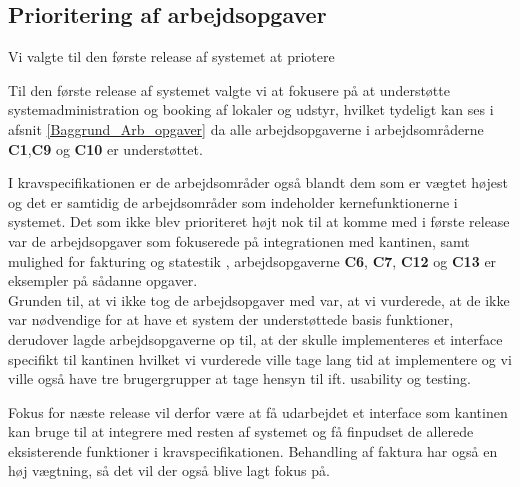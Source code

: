 \subsection{Prioritering af arbejdsopgaver}
\label{Evaluation_workareas_priorities}
Vi valgte til den første release af systemet at priotere

Til den første release af systemet valgte vi at fokusere på at understøtte systemadministration og booking af lokaler og udstyr, hvilket tydeligt kan ses i afsnit \ref{Baggrund_Arb_opgaver} da alle arbejdsopgaverne i arbejdsområderne \textbf{C1},\textbf{C9} og \textbf{C10} er understøttet. 

I kravspecifikationen er de arbejdsområder også blandt dem som er vægtet højest og det er samtidig de arbejdsområder som indeholder kernefunktionerne i systemet. Det som ikke blev prioriteret højt nok til at komme med i første release var de arbejdsopgaver som fokuserede på integrationen med kantinen, samt mulighed for fakturing og statestik , arbejdsopgaverne \textbf{C6}, \textbf{C7}, \textbf{C12} og \textbf{C13} er eksempler på sådanne opgaver.
\\Grunden til, at vi ikke tog de arbejdsopgaver med var, at vi vurderede, at de ikke var nødvendige for at have et system der understøttede basis funktioner, derudover lagde arbejdsopgaverne op til, at der skulle implementeres et interface specifikt til kantinen hvilket vi vurderede ville tage lang tid at implementere og vi ville også have tre brugergrupper at tage hensyn til ift. usability og testing.

Fokus for næste release vil derfor være at få udarbejdet et interface som kantinen kan bruge til at integrere med resten af systemet og få finpudset de allerede eksisterende funktioner i kravspecifikationen. Behandling af faktura har også en høj vægtning, så det vil der også blive lagt fokus på. 

